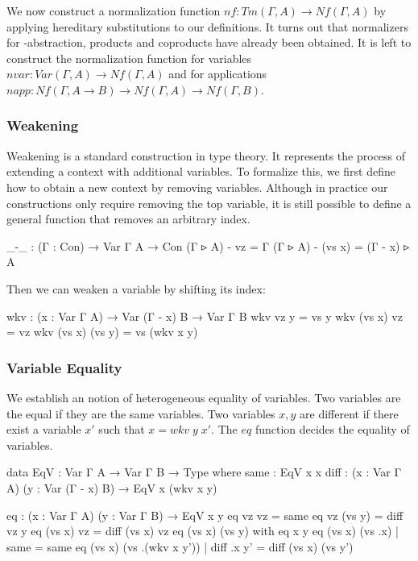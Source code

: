 We now construct a normalization function $nf : Tm(\Gamma,A) \to Nf(\Gamma,A)$ by applying hereditary substitutions to our definitions. It turns out that normalizers for \lambda-abstraction, products and coproducts have already been obtained. It is left to construct the normalization function for variables $nvar : Var(\Gamma,A) \to Nf(\Gamma,A)$ and for applications $napp : Nf(\Gamma,A \to B) \to Nf(\Gamma,A) \to Nf(\Gamma,B)$.

\subsubsection*{Weakening}

Weakening is a standard construction in type theory. It represents the process of extending a context with additional variables. To formalize this, we first define how to obtain a new context by removing variables. Although in practice our constructions only require removing the top variable, it is still possible to define a general function that removes an arbitrary index.

\begin{code}[hide]
_-_ : (Γ : Con) → Var Γ A → Con
(Γ ▹ A) - vz = Γ
(Γ ▹ A) - (vs x) = (Γ - x) ▹ A
\end{code}

Then we can weaken a variable by shifting its index:

\begin{code}
wkv : (x : Var Γ A) → Var (Γ - x) B → Var Γ B
wkv vz y = vs y
wkv (vs x) vz = vz
wkv (vs x) (vs y) = vs (wkv x y)
\end{code}

\subsubsection*{Variable Equality}

We establish an notion of heterogeneous equality of variables. Two variables are the equal if they are the same variables. Two variables $x, y$ are different if there exist a variable $x'$ such that $x = wkv\;y\;x'$. The $eq$ function decides the equality of variables.

\begin{code}
data EqV : Var Γ A → Var Γ B → Type where
  same : EqV x x
  diff : (x : Var Γ A) (y : Var (Γ - x) B) → EqV x (wkv x y)

eq : (x : Var Γ A) (y : Var Γ B) → EqV x y
eq vz vz = same
eq vz (vs y) = diff vz y
eq (vs x) vz = diff (vs x) vz
eq (vs x) (vs y) with eq x y
eq (vs x) (vs .x)          | same = same
eq (vs x) (vs .(wkv x y')) | diff .x y' = diff (vs x) (vs y')
\end{code}

